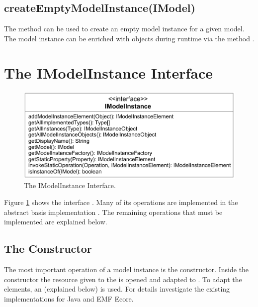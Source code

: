 \subsection{createEmptyModelInstance(IModel)}

The method  can be used to create an
empty model instance for a given model. The model instance can be enriched with 
objects during runtime via the method 
.



\section{The IModelInstance Interface}

\begin{figure}
	\centering
	\includegraphics[width=0.8\linewidth]{figures/modelInstanceTypeAdaptation/modelInstanceInterface}
	\caption{The IModelInstance Interface.}
	\label{pic:modelInstanceTypeAdaptation:modelInstanceInterface}
\end{figure}

Figure \ref{pic:modelInstanceTypeAdaptation:modelInstanceInterface} shows the 
interface . Many of its operations are implemented in the 
abstract basis implementation . The remaining 
operations that must be implemented are explained below.


\subsection{The Constructor}

The most important operation of a model instance is the constructor. Inside the 
constructor the resource given to the  is opened
and adapted to . To adapt the elements, an 
 (explained below) is used. For details investigate
the existing  implementations for Java and \acs{EMF}
Ecore.


